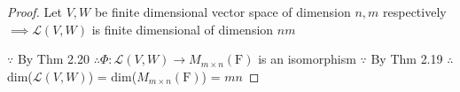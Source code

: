 \begin{proof}
	Let $V,W$ be finite dimensional vector space of dimension $n,m$ respectively $\implies \mathscr{L}(V,W)$ is finite dimensional of dimension $nm$
	
	$\because$ By Thm 2.20 $\therefore \Phi : \mathscr{L}(V,W) \rightarrow M_{m \times n}(\mathrm{F})$ is an isomorphism $\because$ By Thm 2.19 $\therefore$ dim($\mathscr{L}(V,W)$) = dim($M_{m \times n}(\mathrm{F})$) = $mn$
\end{proof}
